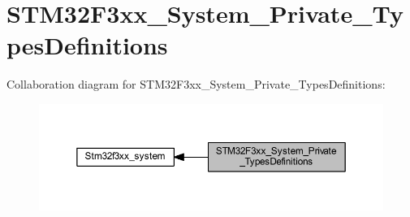 \hypertarget{group___s_t_m32_f3xx___system___private___types_definitions}{}\section{S\+T\+M32\+F3xx\+\_\+\+System\+\_\+\+Private\+\_\+\+Types\+Definitions}
\label{group___s_t_m32_f3xx___system___private___types_definitions}
Collaboration diagram for S\+T\+M32\+F3xx\+\_\+\+System\+\_\+\+Private\+\_\+\+Types\+Definitions\+:\nopagebreak
\begin{figure}[H]
\begin{center}
\leavevmode
\includegraphics[width=350pt]{group___s_t_m32_f3xx___system___private___types_definitions}
\end{center}
\end{figure}
